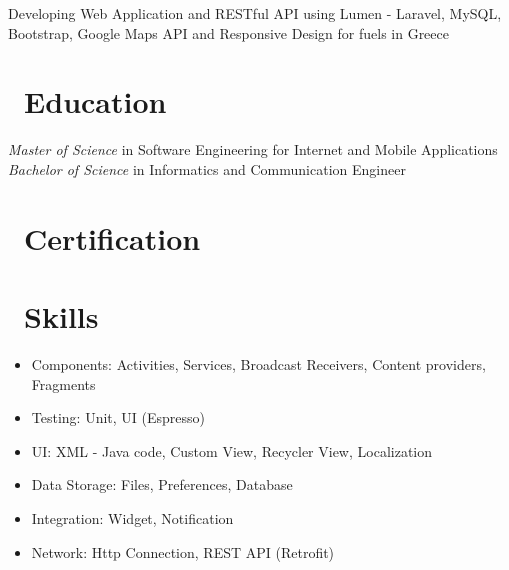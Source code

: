 \documentclass{resume}
\begin{document}
Developing Web Application and RESTful API using Lumen - Laravel, MySQL, Bootstrap, Google Maps API and Responsive Design for fuels in Greece

\section{\faGraduationCap\ Education}
\textit{Master of Science} in Software Engineering for Internet and Mobile Applications
\textit{Bachelor of Science} in Informatics and Communication Engineer

\section{\faCertificate\ Certification}


\section{\faAndroid\ Skills}
\begin{itemize}[parsep=0.5ex]
  \item Components: Activities, Services, Broadcast Receivers, Content providers, Fragments
  \item Testing: Unit, UI (Espresso)
  \item UI: XML - Java code, Custom View, Recycler View, Localization
  \item Data Storage: Files, Preferences, Database
  \item Integration: Widget, Notification
  \item Network: Http Connection, REST API (Retrofit)
\end{itemize}
\end{document}
